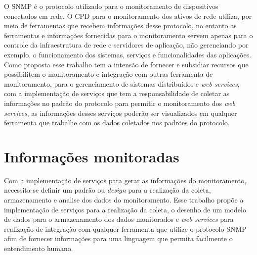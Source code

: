 O SNMP é o protocolo utilizado para o monitoramento de dispositivos conectados em rede. O CPD para o monitoramento dos ativos de rede utiliza, por meio de ferramentas que recebem informações desse protocolo, no entanto as ferramentas e informações fornecidas para o monitoramento servem apenas para o controle da infraestrutura de rede e servidores de aplicação, não gerenciando por exemplo, o funcionamento dos sistemas, serviços e funcionalidades das aplicações. Como proposta esse trabalho tem a intensão de fornecer e subsidiar  recursos que possibilitem o monitoramento e integração com outras ferramenta de monitoramento, para o gerenciamento de sistemas distribuídos e \textit{web services}, com a implementação de serviços que tem a responsabilidade de coletar as informações no padrão do protocolo para permitir o monitoramento dos \textit{web services}, as informações desses serviços poderão ser visualizados em qualquer ferramenta que trabalhe com os dados coletados nos padrões do protocolo.           


\section{Informações monitoradas}

Com a implementação de serviços para gerar as informações do monitoramento, necessita-se definir um padrão ou \textit{design} para a realização da coleta, armazenamento e analise dos dados do monitoramento. Esse trabalho propõe a implementação de serviços para a realização da coleta, o desenho de um modelo de dados para o armazenamento dos dados monitorados e \textit{web services} para realização de integração com qualquer ferramenta que utilize o protocolo SNMP afim de fornecer informações para uma linguagem que permita facilmente o entendimento humano. 

